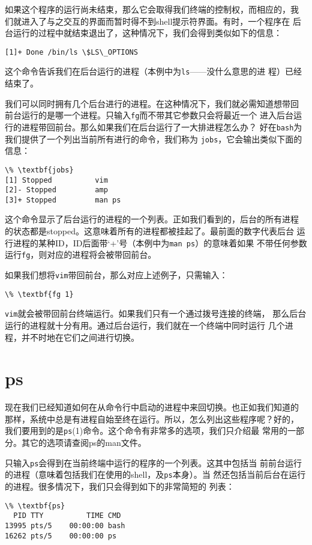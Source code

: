 如果这个程序的运行尚未结束，那么它会取得我们终端的控制权，而相应的，我
们就进入了与之交互的界面而暂时得不到shell提示符界面。有时，一个程序在
后台运行的过程中就结束退出了，这种情况下，我们会得到类似如下的信息：
\begin{Verbatim}[frame=single, commandchars=\\\{\}]
[1]+ Done /bin/ls \$LS\_OPTIONS
\end{Verbatim}
这个命令告诉我们在后台运行的进程（本例中为\texttt{ls}——没什么意思的进
程）已经结束了。

我们可以同时拥有几个后台进行的进程。在这种情况下，我们就必需知道想带回
前台运行的是哪一个进程。只输入\texttt{fg}而不带其它参数只会将最近一个
进入后台运行的进程带回前台。那么如果我们在后台运行了一大排进程怎么办？
好在\texttt{bash}为我们提供了一个列出当前所有进行的命令，我们称为
\texttt{jobs}，它会输出类似下面的信息：
\begin{Verbatim}[frame=single, commandchars=\\\{\}]
\% \textbf{jobs}
[1] Stopped          vim
[2]- Stopped         amp
[3]+ Stopped         man ps
\end{Verbatim}
这个命令显示了后台运行的进程的一个列表。正如我们看到的，后台的所有进程
的状态都是stopped。这意味着所有的进程都被挂起了。最前面的数字代表后台
运行进程的某种ID，ID后面带`+'号（本例中为\texttt{man ps}）的意味着如果
不带任何参数运行\texttt{fg}，则对应的进程将会被带回前台。

如果我们想将\texttt{vim}带回前台，那么对应上述例子，只需输入：
\begin{Verbatim}[frame=single, commandchars=\\\{\}]
\% \textbf{fg 1}
\end{Verbatim}
\texttt{vim}就会被带回前台终端运行。如果我们只有一个通过拨号连接的终端，
那么后台运行的进程就十分有用。通过后台运行，我们就在一个终端中同时运行
几个进程，并不时地在它们之间进行切换。


\section{ps}
\label{chap:processControl:ps}
现在我们已经知道如何在从命令行中启动的进程中来回切换。也正如我们知道的
那样，系统中总是有进程自始至终在运行。所以，怎么列出这些程序呢？好的，
我们要用到的是\texttt{ps}(1)命令。这个命令有非常多的选项，我们只介绍最
常用的一部分。其它的选项请查阅ps的man文件。

只输入\texttt{ps}会得到在当前终端中运行的程序的一个列表。这其中包括当
前前台运行的进程（意味着包括我们在使用的shell，及\texttt{ps}本身）。当
然还包括当前后台在运行的进程。很多情况下，我们只会得到如下的非常简短的
列表：
\begin{Verbatim}[frame=single, commandchars=\\\{\}]
\% \textbf{ps}
  PID TTY          TIME CMD
13995 pts/5    00:00:00 bash
16262 pts/5    00:00:00 ps
\end{Verbatim}

